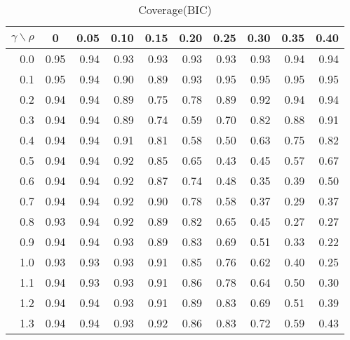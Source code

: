 \documentclass[12pt]{article}
\begin{document}
%
\begin{table}[!tbp]
\caption{Coverage(BIC)}
 \begin{center}
 \begin{tabular}{r|rrrrrrrrr}\hline\hline
\multicolumn{1}{c|}{$\gamma\backslash\rho$}&\multicolumn{1}{c}{0}&\multicolumn{1}{c}{0.05}&\multicolumn{1}{c}{0.10}&\multicolumn{1}{c}{0.15}&\multicolumn{1}{c}{0.20}&\multicolumn{1}{c}{0.25}&\multicolumn{1}{c}{0.30}&\multicolumn{1}{c}{0.35}&\multicolumn{1}{c}{0.40}\tabularnewline
\hline

0.0&0.95&0.94&0.93&0.93&0.93&0.93&0.93&0.94&0.94\tabularnewline
0.1&0.95&0.94&0.90&0.89&0.93&0.95&0.95&0.95&0.95\tabularnewline
0.2&0.94&0.94&0.89&0.75&0.78&0.89&0.92&0.94&0.94\tabularnewline
0.3&0.94&0.94&0.89&0.74&0.59&0.70&0.82&0.88&0.91\tabularnewline
0.4&0.94&0.94&0.91&0.81&0.58&0.50&0.63&0.75&0.82\tabularnewline
0.5&0.94&0.94&0.92&0.85&0.65&0.43&0.45&0.57&0.67\tabularnewline
0.6&0.94&0.94&0.92&0.87&0.74&0.48&0.35&0.39&0.50\tabularnewline
0.7&0.94&0.94&0.92&0.90&0.78&0.58&0.37&0.29&0.37\tabularnewline
0.8&0.93&0.94&0.92&0.89&0.82&0.65&0.45&0.27&0.27\tabularnewline
0.9&0.94&0.94&0.93&0.89&0.83&0.69&0.51&0.33&0.22\tabularnewline
1.0&0.93&0.93&0.93&0.91&0.85&0.76&0.62&0.40&0.25\tabularnewline
1.1&0.94&0.93&0.93&0.91&0.86&0.78&0.64&0.50&0.30\tabularnewline
1.2&0.94&0.94&0.93&0.91&0.89&0.83&0.69&0.51&0.39\tabularnewline
1.3&0.94&0.94&0.93&0.92&0.86&0.83&0.72&0.59&0.43\tabularnewline
\hline
\end{tabular}

\end{center}

\end{table}
\end{document}
